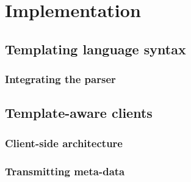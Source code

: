 \chapter{Implementation}
\section{Templating language syntax}
\subsection{Integrating the parser}
\section{Template-aware clients}
\subsection{Client-side architecture}
\subsection{Transmitting meta-data}

